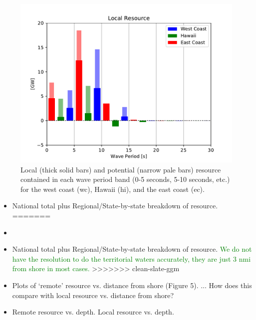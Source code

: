 \begin{figure}[ht]
  \centering
  \includegraphics[width=\linewidth]{../fig/LocalResource_Freq01.pdf}
  \caption{Local (thick solid bars) and potential (narrow pale bars) resource contained in each wave period band (0-5 seconds, 5-10 seconds, etc.) for the west coast (wc), Hawaii (hi), and the east coast (ec).}
  \label{fig:remote-freq}
\end{figure}

\begin{itemize}
\item National total plus Regional/State-by-state breakdown of resource.
=======
\item {}
\item National total plus Regional/State-by-state breakdown of resource. \textcolor{green}{We do not have the resolution to do the territorial waters accurately, they are just 3 nmi from shore in most cases.}
>>>>>>> clean-slate-ggm
\item Plots of ‘remote’ resource vs. distance from shore (Figure 5). ... How does this compare with local resource vs. distance from shore?
\item Remote resource vs. depth. Local resource vs. depth.
\end{itemize}


